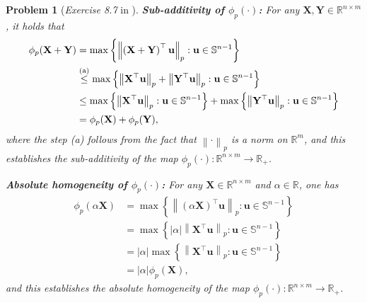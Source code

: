 \documentclass[11pt]{article}
\newtheorem{problem}{Problem}
\numberwithin{equation}{problem}
\begin{document}
\begin{problem} [\emph{Exercise 8.7} in \cite{calafiore2014optimization}]
{\indent \textbf{Sub-additivity of $\phi_p (\cdot)$:} For any $\mathbf{X}, \mathbf{Y} \in \mathbb{R}^{n \times m}$, it holds that
\begin{equation*}
    \begin{split}
        \phi_p (\mathbf{X} + \mathbf{Y}) &=
        \max \left\{ \left\| \left( \mathbf{X} + \mathbf{Y} \right)^{\top} \mathbf{u} \right\|_p : \mathbf{u} \in \mathbb{S}^{n-1} \right\} \\
        &\stackrel{\textnormal{(a)}}{\leq} \max \left\{ \left\| \mathbf{X}^{\top} \mathbf{u} \right\|_p + \left\| \mathbf{Y}^{\top} \mathbf{u} \right\|_p : \mathbf{u} \in \mathbb{S}^{n-1} \right\} \\
        &\leq \max \left\{ \left\| \mathbf{X}^{\top} \mathbf{u} \right\|_p : \mathbf{u} \in \mathbb{S}^{n-1} \right\} + \max \left\{ \left\| \mathbf{Y}^{\top} \mathbf{u} \right\|_p : \mathbf{u} \in \mathbb{S}^{n-1} \right\} \\
        &= \phi_p (\mathbf{X}) + \phi_p (\mathbf{Y}),
    \end{split}
\end{equation*}
where the step (a) follows from the fact that $\left\| \cdot \right\|_p$ is a norm on $\mathbb{R}^m$, and this establishes the sub-additivity of the map $\phi_p (\cdot) : \mathbb{R}^{n \times m} \rightarrow \mathbb{R}_{+}$.
\medskip

\indent \textbf{Absolute homogeneity of $\phi_p (\cdot)$:} For any $\mathbf{X} \in \mathbb{R}^{n \times m}$ and $\alpha \in \mathbb{R}$, one has
\begin{equation*}
    \begin{split}
        \phi_p (\alpha \mathbf{X}) &= 
        \max \left\{ \left\| \left( \alpha \mathbf{X} \right)^{\top} \mathbf{u} \right\|_p : \mathbf{u} \in \mathbb{S}^{n-1} \right\} \\
        &= \max \left\{ \left| \alpha \right| \left\| \mathbf{X}^{\top} \mathbf{u} \right\|_p : \mathbf{u} \in \mathbb{S}^{n-1} \right\} \\
        &= \left| \alpha \right| \max \left\{ \left\| \mathbf{X}^{\top} \mathbf{u} \right\|_p : \mathbf{u} \in \mathbb{S}^{n-1} \right\} \\
        &= \left| \alpha \right| \phi_p (\mathbf{X}),
    \end{split}
\end{equation*}
and this establishes the absolute homogeneity of the map $\phi_p (\cdot) : \mathbb{R}^{n \times m} \rightarrow \mathbb{R}_{+}$.
\medskip

}
\end{problem}
\end{document}
